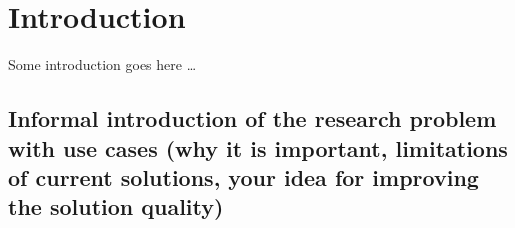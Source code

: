 \documentclass[]{article}
\begin{document}
\makeatletter
\def\LT@makenoprefixcaption#1#2#3{%
  \LT@mcol\LT@cols c{\hbox to\z@{\hss\parbox[t]\LTcapwidth{
    \sbox\@tempboxa{#1{}#3}
    \ifdim\wd\@tempboxa>\hsize
      #1{}#3
    \else
      \hbox to\hsize{\hfil\box\@tempboxa\hfil}%
    \fi
    \endgraf\vskip\baselineskip}
  \hss}}}
\makeatother

\makeatletter
\let\LT@oldmakecaption=\LT@makecaption
\let\oldthetable=\thetable
\let\oldtheHtable=\theHtable
\makeatother

\makeatletter
{}
\newenvironment{no-prefix-table-caption}{
  \let\LT@makecaption=\LT@makenoprefixcaption
  \renewcommand\thetable{x.\thetableno}
  \renewcommand\theHtable{x.\thetableno}
  \stepcounter{tableno}
}{
  \let\thetable=\oldthetable
  \let\theHtable=\oldtheHtable
  \let\LT@makecaption=\LT@oldmakecaption
  \addtocounter{table}{-1}
}
\makeatother

\makeatletter
\long{}
\makeatother

\makeatletter
\let\@oldmakecaption=\@makecaption
\let\oldthefigure=\thefigure
\let\oldtheHfigure=\theHfigure
\makeatother

\makeatletter
{}
\newenvironment{no-prefix-figure-caption}{
  \let\@makecaption=\@makenoprefixcaption
  \renewcommand\thefigure{x.\thefigno}
  \renewcommand\theHfigure{x.\thefigno}
  \stepcounter{figno}
}{
  \let\thefigure=\oldthefigure
  \let\theHfigure=\oldtheHfigure
  \let\@makecaption=\@oldmakecaption
  \addtocounter{figure}{-1}
}
\makeatother

\section{Introduction}\label{introduction}

Some introduction goes here \ldots{}

\subsection{Informal introduction of the research problem with use cases
(why it is important, limitations of current solutions, your idea for
improving the solution
quality)}\label{informal-introduction-of-the-research-problem-with-use-cases-why-it-is-important-limitations-of-current-solutions-your-idea-for-improving-the-solution-quality}
\end{document}
